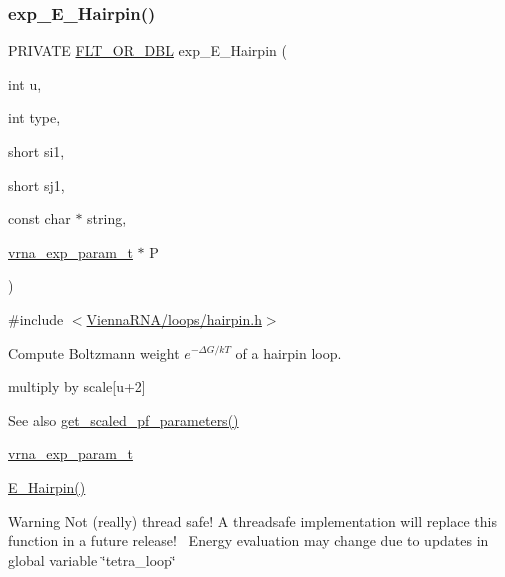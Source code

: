 \subsubsection{\texorpdfstring{exp\+\_\+\+E\+\_\+\+Hairpin()}{exp\_E\_Hairpin()}}
{\footnotesize\ttfamily P\+R\+I\+V\+A\+TE \hyperlink{group__data__structures_ga31125aeace516926bf7f251f759b6126}{F\+L\+T\+\_\+\+O\+R\+\_\+\+D\+BL} exp\+\_\+\+E\+\_\+\+Hairpin (\begin{DoxyParamCaption}\item[{int}]{u,  }\item[{int}]{type,  }\item[{short}]{si1,  }\item[{short}]{sj1,  }\item[{const char $\ast$}]{string,  }\item[{\hyperlink{group__energy__parameters_ga01d8b92fe734df8d79a6169482c7d8d8}{vrna\+\_\+exp\+\_\+param\+\_\+t} $\ast$}]{P }\end{DoxyParamCaption})}



{\ttfamily \#include $<$\hyperlink{hairpin_8h}{Vienna\+R\+N\+A/loops/hairpin.\+h}$>$}



Compute Boltzmann weight $e^{-\Delta G/kT} $ of a hairpin loop. 

multiply by scale\mbox{[}u+2\mbox{]} \begin{DoxySeeAlso}{See also}
\hyperlink{group__energy__parameters_gabf3b9271c41dd3fac02d56e0b02b3344}{get\+\_\+scaled\+\_\+pf\+\_\+parameters()} 

\hyperlink{group__energy__parameters_ga01d8b92fe734df8d79a6169482c7d8d8}{vrna\+\_\+exp\+\_\+param\+\_\+t} 

\hyperlink{group__eval__loops__hp_gadf943ee9a45b7f4cee9192c06210dace}{E\+\_\+\+Hairpin()} 
\end{DoxySeeAlso}
\begin{DoxyWarning}{Warning}
Not (really) thread safe! A threadsafe implementation will replace this function in a future release!~\newline
Energy evaluation may change due to updates in global variable \char`\"{}tetra\+\_\+loop\char`\"{}
\end{DoxyWarning}

